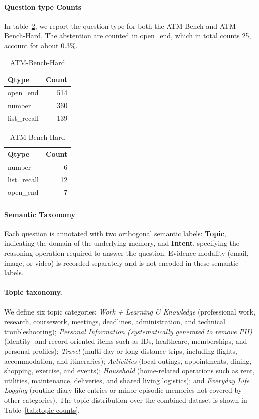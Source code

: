 \documentclass{article}
\theoremstyle{plain}
\theoremstyle{definition}
\theoremstyle{remark}
\begin{document}
\paragraph{Question type Counts} In table~\ref{tab:qtype-counts-combined-hard}, we report the question type for both the ATM-Bench and ATM-Bench-Hard. The abstention are counted in open\_end, which in total counts 25, account for about 0.3\%.
\begin{table}[h]
\centering
\caption{Qtype counts.}
\begin{minipage}[t]{0.48\columnwidth}
\centering
\caption*{ATM-Bench}
\begin{tabular}{lr}
\toprule
Qtype & Count \\
\midrule
open\_end & 514 \\
number & 360 \\
list\_recall & 139 \\
\bottomrule
\end{tabular}
\end{minipage}\hfill
\begin{minipage}[t]{0.48\columnwidth}
\centering
\caption*{ATM-Bench-Hard}
\begin{tabular}{lr}
\toprule
Qtype & Count \\
\midrule
number & 6 \\
list\_recall & 12 \\
open\_end & 7 \\
\bottomrule
\end{tabular}
\end{minipage}
\label{tab:qtype-counts-combined-hard}
\end{table}


\paragraph{Semantic Taxonomy}
Each question is annotated with two orthogonal semantic labels: \textbf{Topic}, indicating the domain of the underlying memory, and \textbf{Intent}, specifying the reasoning operation required to answer the question. Evidence modality (email, image, or video) is recorded separately and is not encoded in these semantic labels.

\paragraph{Topic taxonomy.}
We define six topic categories: \textit{Work + Learning \& Knowledge} (professional work, research, coursework, meetings, deadlines, administration, and technical troubleshooting); \textit{Personal Information (systematically generated to remove PII)} (identity- and record-oriented items such as IDs, healthcare, memberships, and personal profiles); \textit{Travel} (multi-day or long-distance trips, including flights, accommodation, and itineraries); \textit{Activities} (local outings, appointments, dining, shopping, exercise, and events); \textit{Household} (home-related operations such as rent, utilities, maintenance, deliveries, and shared living logistics); and \textit{Everyday Life Logging} (routine diary-like entries or minor episodic memories not covered by other categories). The topic distribution over the combined dataset is shown in Table~\ref{tab:topic-counts}.
\end{document}
